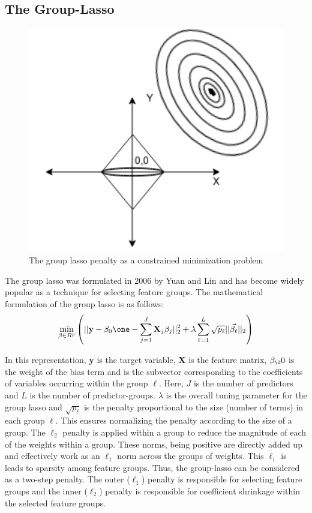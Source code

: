 \documentclass[a4paper,12pt]{article}
\begin{document}
\subsection{The Group-Lasso}

\begin{figure}[H]
    \centering
    \includegraphics[scale=0.4]{group-lasso.png}
    \caption{The group lasso penalty as a constrained minimization problem}
    \label{fig:ALAMO Flowchart}
\end{figure}


The group lasso was formulated in 2006 by Yuan and Lin \cite{yuan2006model} and has become widely popular as a technique for selecting feature groups. The mathematical formulation of the group lasso is as follows:
\begin{eqnarray}
\min_{\beta\in R^p}\left(|| \textbf{y}-\beta_0\one-\sum_{j=1}^J
\textbf{X}_j\beta_j||_2^2 +\lambda \sum_{\ell=1}^L\sqrt{p_\ell} ||\vec{\beta_\ell}||_2\right)
\label{LM.grlasdef}
\end{eqnarray}

\noindent In this representation, \textbf{y} is the target variable,  \textbf{X} is the feature matrix, $\beta_\00$  is the weight of the bias term and  \vec{$\beta_\ell$}  is the subvector corresponding to the coefficients of variables occurring within the group $\ell$. Here, $J$ is the number of predictors and $L$ is the number of predictor-groups. $\lambda$ is the overall tuning parameter for the group lasso and $\sqrt{p_\ell}$ is the penalty proportional to the size (number of terms) in each group $\ell$. This ensures  normalizing the penalty according to the size of a group. The $\ell_2$ penalty is applied within a group to reduce the magnitude of each of the weights within a group. These norms, being positive are directly added up and effectively work as an $\ell_1$ norm across the groups of weights. This $\ell_1$ is leads to sparsity among feature groups. Thus, the group-lasso can be considered as a two-step penalty. The outer ($\ell_1$) penalty is responsible for selecting feature groups and the inner ($\ell_2$) penalty is responsible for coefficient shrinkage within the selected feature groups.
\end{document}
